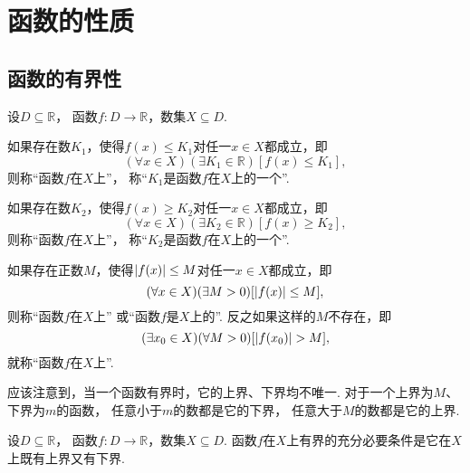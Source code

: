 \section{函数的性质}
\subsection{函数的有界性}
\begin{definition}\label{definition:函数.函数的有界性}
设\(D\subseteq\mathbb{R}\)，
函数\(f\colon D\to\mathbb{R}\)，数集\(X \subseteq D\).

如果存在数\(K_1\)，使得\(f(x) \leq K_1\)对任一\(x \in X\)都成立，即\begin{equation*}
	(\forall x \in X)
	(\exists K_1 \in \mathbb{R})
	[f(x) \leq K_1],
\end{equation*}
则称“函数\(f\)在\(X\)上”，
称“\(K_1\)是函数\(f\)在\(X\)上的一个”.

如果存在数\(K_2\)，使得\(f(x) \geq K_2\)对任一\(x \in X\)都成立，即\begin{equation*}
	(\forall x \in X)
	(\exists K_2 \in \mathbb{R})
	[f(x) \geq K_2],
\end{equation*}
则称“函数\(f\)在\(X\)上”，
称“\(K_2\)是函数\(f\)在\(X\)上的一个”.

如果存在正数\(M\)，使得\(\abs{f(x)} \leq M\)对任一\(x \in X\)都成立，即\begin{equation*}
	(\forall x \in X)
	(\exists M>0)[
		\abs{f(x)} \leq M
	],
\end{equation*}
则称“函数\(f\)在\(X\)上”
或“函数\(f\)是\(X\)上的”.
反之如果这样的\(M\)不存在，即\begin{equation*}
	(\exists x_0 \in X)
	(\forall M>0)[
		\abs{f(x_0)} > M
	],
\end{equation*}
就称“函数\(f\)在\(X\)上”.
\end{definition}

应该注意到，当一个函数有界时，它的上界、下界均不唯一.
对于一个上界为\(M\)、下界为\(m\)的函数，
任意小于\(m\)的数都是它的下界，
任意大于\(M\)的数都是它的上界.

\begin{theorem}
设\(D\subseteq\mathbb{R}\)，
函数\(f\colon D\to\mathbb{R}\)，数集\(X \subseteq D\).
函数\(f\)在\(X\)上有界的充分必要条件是它在\(X\)上既有上界又有下界.
\end{theorem}

